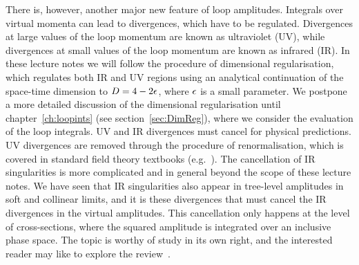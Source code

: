 There is, however, another major new feature of loop amplitudes. Integrals over
virtual momenta can lead to divergences, which have to be regulated.
Divergences at large values of the loop momentum are known as ultraviolet (UV),
while divergences at small values of the loop momentum are known as infrared
(IR). In these lecture notes we will follow the procedure of dimensional regularisation,
which regulates both IR and UV regions using an analytical continuation of the
space-time dimension to $D=4-2\epsilon$, where $\epsilon$ is a small parameter. We
postpone a more detailed discussion of the dimensional regularisation until
chapter~\ref{ch:loopints} (see section~\ref{sec:DimReg}), where we consider the
evaluation of the loop integrals.  UV and IR divergences must cancel for
physical predictions. UV divergences are removed through the procedure of
renormalisation, which is covered in standard field theory textbooks (e.g.\ \cite{ch3_Sterman:1993hfp,ch3_Peskin:1995ev,ch3_Schwartz:2014sze}). The
cancellation of IR singularities is more complicated and in general beyond the
scope of these lecture notes. We have seen that IR singularities also appear in
tree-level amplitudes in soft and collinear limits, and it is these divergences
that must cancel the IR divergences in the virtual amplitudes. This
cancellation only happens at the level of cross-sections, where the squared
amplitude is integrated over an inclusive phase space. The topic is worthy of
study in its own right, and the interested reader may like to explore the
review~\cite{ch3_Agarwal:2021ais}.

